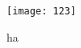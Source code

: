 \begin{figure}[H]
\begin{center}
\texttt{[image: 123]}
\end{center}
\caption{ha}
\label{123}
\end{figure}
